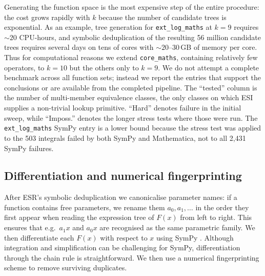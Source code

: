 \documentclass[preprint,12pt,authoryear]{elsarticle}
\newcommand{\hd}[1]{{\color{red}\textbf{[HD: #1]}}}
\begin{document}
Generating the function space is the most expensive step of the entire procedure: the cost grows rapidly with $k$ because the number of candidate trees is exponential. As an example, tree generation for \texttt{ext\_log\_maths} at $k=9$ requires ${\sim}20$ CPU-hours, and symbolic deduplication of the resulting 56 million candidate trees requires several days on tens of cores with ${\sim}20$--30\,GB of memory per core.
Thus for computational reasons we extend \texttt{core\_maths}, containing relatively few operators, to $k=10$ but the others only to $k=9$. We do not attempt a complete benchmark across all function sets; instead we report the entries that support the conclusions or are available from the completed pipeline.  The ``tested'' column is the number of multi-member equivalence classes, the only classes on which ESI supplies a non-trivial lookup primitive.  ``Hard'' denotes failure in the initial sweep,
while ``Imposs.'' denotes the longer stress tests where those were run.  The \texttt{ext\_log\_maths} SymPy entry is a lower bound because the stress test was applied to the 503 integrals failed by both SymPy and Mathematica, not to all 2{,}431 SymPy failures.

\subsection{Differentiation and numerical fingerprinting}
\label{sec:fingerprint}

After ESR's symbolic deduplication we canonicalise parameter names: if a function contains free parameters, we rename them $a_0, a_1, \ldots$ in the order they first appear when reading the expression tree of $F(x)$ from left to right. This ensures that e.g.\ $a_1 x$ and $a_0 x$ are recognised as the same parametric family. We then differentiate each $F(x)$ with respect to $x$ using SymPy \citep{Meurer2017}. Although integration and simplification can be challenging for SymPy, differentiation through the chain rule is straightforward. We then use a numerical fingerprinting scheme to remove surviving duplicates.
\end{document}
